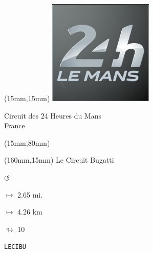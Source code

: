 \begin{textblock*}{50mm}(15mm,15mm)%
\includegraphics[width=50mm]{LG/2015-05-20_00084.png}
\par Circuit des 24 Heures du Mans\\ France
\end{textblock*}
\begin{textblock*}{185mm}(15mm,80mm)%
\end{textblock*}
\begin{textblock*}{40mm}(160mm,15mm)%
Le Circuit Bugatti
\par \Huge$\circlearrowleft$
\Large
\par$\mapsto$ 2.65 mi.
\par$\mapsto$ 4.26 km
\par$\looparrowright$ 10
\par\hfill\tiny\tt LECIBU\\
\end{textblock*}
\null\newpage

